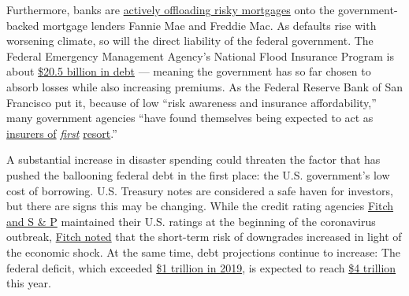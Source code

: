Furthermore, banks are
\href{https://www.nytimes.com/2019/09/27/climate/mortgage-climate-risk.html?campaignId=7JFJX}{actively
offloading risky mortgages} onto the government-backed mortgage lenders
Fannie Mae and Freddie Mac. As defaults rise with worsening climate, so
will the direct liability of the federal government. The Federal
Emergency Management Agency's National Flood Insurance Program is about
\href{https://www.insurancejournal.com/blogs/right-street/2018/09/13/500996.htm}{\$20.5
billion in debt} --- meaning the government has so far chosen to absorb
losses while also increasing premiums. As the Federal Reserve Bank of
San Francisco put it, because of low ``risk awareness and insurance
affordability,'' many government agencies ``have found themselves being
expected to act as
\href{https://www.frbsf.org/community-development/publications/community-development-investment-review/2019/october/insurance-innovation-and-community-based-adaptation-finance/\#_ftn2}{insurers
of}
\href{https://www.frbsf.org/community-development/publications/community-development-investment-review/2019/october/insurance-innovation-and-community-based-adaptation-finance/\#_ftn2}{\emph{first}}
\href{https://www.frbsf.org/community-development/publications/community-development-investment-review/2019/october/insurance-innovation-and-community-based-adaptation-finance/\#_ftn2}{resort}.''

A substantial increase in disaster spending could threaten the factor
that has pushed the ballooning federal debt in the first place: the U.S.
government's low cost of borrowing. U.S. Treasury notes are considered a
safe haven for investors, but there are signs this may be changing.
While the credit rating agencies
\href{https://www.reuters.com/article/usa-ratings-sp/sp-affirms-us-amid-coronavirus-outbreak-says-debt-and-deficit-will-worsen-idUSFWN2BQ1CV}{Fitch
and S \& P} maintained their U.S. ratings at the beginning of the
coronavirus outbreak,
\href{https://www.fitchratings.com/research/us-public-finance/fitch-affirms-united-states-at-aaa-outlook-stable-26-03-2020}{Fitch
noted} that the short-term risk of downgrades increased in light of the
economic shock. At the same time, debt projections continue to increase:
The federal deficit, which exceeded
\href{https://www.nytimes.com/2020/01/13/business/budget-deficit-1-trillion-trump.html}{\$1
trillion in 2019}, is expected to reach
\href{https://www.washingtonpost.com/us-policy/2020/04/18/record-government-corporate-debt-risk-tipping-point-after-pandemic-passes/}{\$4
trillion} this year.

